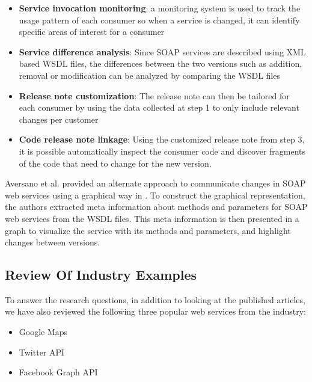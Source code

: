 \documentclass[runningheads,a4paper]{llncs}
\begin{document}
\begin{itemize}
  \item \textbf{Service invocation monitoring}: a monitoring system is used to track the usage pattern of each consumer so when a service is changed, it can identify specific areas of interest for a consumer
  \item \textbf{Service difference analysis}: Since SOAP services are described using XML based WSDL files, the differences between the two versions such as addition, removal or modification can be analyzed by comparing the WSDL files
  \item \textbf{Release note customization}: The release note can then be tailored for each consumer by using the data collected at step 1 to only include relevant changes per customer
  \item \textbf{Code release note linkage}: Using the customized release note from step 3, it is possible automatically inspect the consumer code and discover fragments of the code that need to change for the new version.
\end{itemize}

Aversano et al. provided an alternate approach to communicate changes in SOAP web services using a graphical way in \cite{aversano2005visualizing}. To construct the graphical representation, the authors extracted meta information about methods and parameters for SOAP web services from the WSDL files. This meta information is then presented in a graph to visualize the service with its methods and parameters, and highlight changes between versions.



\subsection{Review Of Industry Examples} %
\label{sub:review_of_industry_examples}

To answer the research questions, in addition to looking at the published articles, we have also reviewed the following three popular web services from the industry:

\begin{itemize}
  \item Google Maps
  \item Twitter API
  \item Facebook Graph API
\end{itemize}
\end{document}
